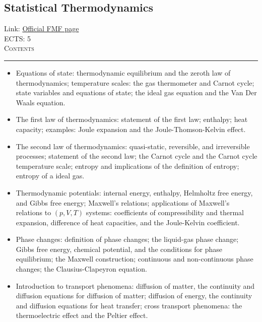 \documentclass[11pt, a4paper]{article}
\newenvironment{course}[3]{
\subsection{#1}%
Link: \href{#2}{Official FMF page}\\%
ECTS: #3%
\vspace{1ex}
\\
{\large \textsc{Contents}}\\[-0.9ex]%
\rule{\textwidth}{0.5pt}
\vspace{-3ex}
}
{}
\newenvironment{chapter}[1]{
\begin{tcolorbox}[title=#1, breakable]
}
{\end{tcolorbox}}
\begin{document}
\begin{course}{Statistical Thermodynamics}{https://www.fmf.uni-lj.si/en/study-physics/programmes/1fiz/2020/7000777/courses/1174/}{5}
    \label{statistical-thermodynamics}

    \begin{chapter}{Part 1: Classical thermodynamics}
        \begin{itemize}
            \item Equations of state: thermodynamic equilibrium and the zeroth law of thermodynamics; temperature scales: the gas thermometer and Carnot cycle; state variables and equations of state; the ideal gas equation and the Van Der Waals equation.

            \item The first law of thermodynamics: statement of the first law; enthalpy; heat capacity; examples: Joule expansion and the Joule-Thomson-Kelvin effect.

            \item The second law of thermodynamics: quasi-static, reversible, and irreversible processes; statement of the second law; the Carnot cycle and the Carnot cycle temperature scale; entropy and implications of the definition of entropy; entropy of a ideal gas.

            \item Thermodynamic potentials: internal energy, enthalpy, Helmholtz free energy, and Gibbs free energy; Maxwell's relations; applications of Maxwell's relations to $ (p, V, T) $ systems: coefficients of compressibility and thermal expansion, difference of heat capacities, and the Joule-Kelvin coefficient.

            \item Phase changes: definition of phase changes; the liquid-gas phase change; Gibbs free energy, chemical potential, and the conditions for phase equilibrium; the Maxwell construction; continuous and non-continuous phase changes; the Clausius-Clapeyron equation.

            \item Introduction to transport phenomena: diffusion of matter, the continuity and diffusion equations for diffusion of matter; diffusion of energy, the continuity and diffusion equations for heat transfer; cross transport phenomena: the thermoelectric effect and the Peltier effect.
            
        \end{itemize}
    \end{chapter}


\end{course}
\end{document}
